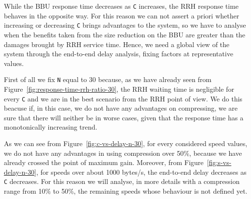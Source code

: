 \documentclass[11pt,a4paper,oneside, openright]{article}
\begin{document}
While the BBU response time decreases as \texttt{C} increases, the RRH response time behaves in the opposite way. For this reason we can not assert a priori whether increasing or decreasing \texttt{C} brings advantages to the system, so we have to analyse when the benefits taken from the size reduction on the BBU are greater than the damages brought by RRH service time. Hence, we need a global view of the system through the end-to-end delay analysis, fixing factors at representative values.

First of all we fix \texttt{N} equal to 30 because, as we have already seen from Figure~\ref{fig:response-time-rrh-ratio-30}, the RRH waiting time is negligible for every \texttt{C} and we are in the best scenario from the RRH point of view. We do this beacuse if, in this case, we do not have any advantages on compressing, we are sure that there will neither be in worse cases, given that the response time has a monotonically increasing trend.


As we can see from Figure~\ref{fig:c-vs-delay-n-30}, for every considered speed values, we do not have any advantages in using compression over 50\%, because we have already crossed the point of maximum gain. 
Moreover, from Figure~\ref{fig:s-vs-delay-n-30}, for speeds over about 1000 bytes/s, the end-to-end delay decreases as \texttt{C} decreases. For this reason we will analyse, in more details with a compression range from 10\% to 50\%, the remaining speeds whose behaviour is not defined yet.
\end{document}
